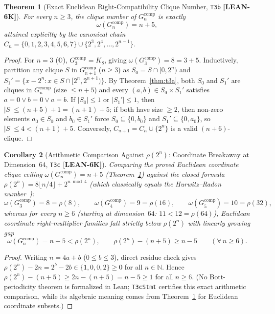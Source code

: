 \documentclass[11pt,reqno]{amsart}
\newcommand{\code}[1]{\textnormal{\texttt{\small\nolinkurl{#1}}}}
\theoremstyle{plain}
\newtheorem{theorem}{Theorem}[section]
\newtheorem{corollary}[theorem]{Corollary}
\theoremstyle{definition}
\theoremstyle{remark}
\newcommand{\tagLean}{\mbox{\textsf{\textbf{\color{oiBlue}[LEAN-6K]}}}}
\newcommand{\OO}{\mathbb{O}}
\newcommand{\N}{\mathbb{N}}
\newcommand{\comp}{\mathrm{comp}}
\begin{document}
\begin{theorem}[Exact Euclidean Right-Compatibility Clique Number, \texttt{T3b} \tagLean]
\label{thm:t3b}
For every $n \ge 3$, the clique number of $G_n^{\comp}$ is exactly
\begin{equation}
  \omega(G_n^{\comp}) = n + 5,
\end{equation}
attained explicitly by the canonical chain
$C_n = \{0, 1, 2, 3, 4, 5, 6, 7\} \cup \{2^3, 2^4, \dots, 2^{n-1}\}$.
\end{theorem}

\begin{proof}
For $n = 3$ ($\OO$), $G_3^{\comp} = K_8$, giving $\omega(G_3^{\comp}) = 8 = 3 + 5$. Inductively,
partition any clique $S$ in $G_{n+1}^{\comp}$ ($n \ge 3$) as $S_0 = S \cap [0, 2^n)$ and
$S_1' = \{x - 2^n : x \in S \cap [2^n, 2^{n+1})\}$. By Theorem~\ref{thm:t3a}, both $S_0$ and
$S_1'$ are cliques in $G_n^{\comp}$ (size $\le n+5$) and every $(a, b) \in S_0 \times S_1'$
satisfies $a = 0 \lor b = 0 \lor a = b$. If $|S_0| \le 1$ or $|S_1'| \le 1$, then
$|S| \le (n+5) + 1 = (n+1) + 5$; if both have size $\ge 2$, then non-zero elements $a_0 \in S_0$
and $b_0 \in S_1'$ force $S_0 \subseteq \{0, b_0\}$ and $S_1' \subseteq \{0, a_0\}$, so
$|S| \le 4 < (n+1)+5$. Conversely, $C_{n+1} = C_n \cup \{2^n\}$ is a valid $(n+6)$-clique.
\end{proof}

\begin{corollary}[Arithmetic Comparison Against $\rho(2^n)$: Coordinate Breakaway at Dimension~64, \texttt{T3c} \tagLean]
\label{thm:t3c}
Comparing the proved Euclidean coordinate clique ceiling $\omega(G_n^{\comp}) = n + 5$
(Theorem~\ref{thm:t3b}) against the closed formula $\rho(2^n) = 8\lfloor n/4\rfloor + 2^{n \bmod 4}$
(which classically equals the Hurwitz--Radon number~\cite{hurwitz1922,radon1922,adams1962}):
\[
  \omega(G_3^{\comp}) = 8 = \rho(8), \qquad
  \omega(G_4^{\comp}) = 9 = \rho(16), \qquad
  \omega(G_5^{\comp}) = 10 = \rho(32),
\]
whereas for every $n \ge 6$ (starting at dimension~$64$: $11 < 12 = \rho(64)$), Euclidean
coordinate right-multiplier families fall strictly below $\rho(2^n)$ with linearly growing gap
\begin{equation}
  \omega(G_n^{\comp}) = n + 5 < \rho(2^n), \qquad
  \rho(2^n) - (n + 5) \ge n - 5 \qquad (\forall\, n \ge 6).
\end{equation}
\end{corollary}

\begin{proof}
Writing $n = 4a + b$ ($0 \le b \le 3$), direct residue check gives
$\rho(2^n) - 2n = 2^b - 2b \in \{1, 0, 0, 2\} \ge 0$ for all $n \in \N$. Hence
$\rho(2^n) - (n+5) \ge 2n - (n+5) = n - 5 \ge 1$ for all $n \ge 6$. (No Bott-periodicity
theorem is formalized in Lean; \code{T3cStmt} certifies this exact arithmetic comparison, while
its algebraic meaning comes from Theorem~\ref{thm:t3b} for Euclidean coordinate subsets.)
\end{proof}
\end{document}
